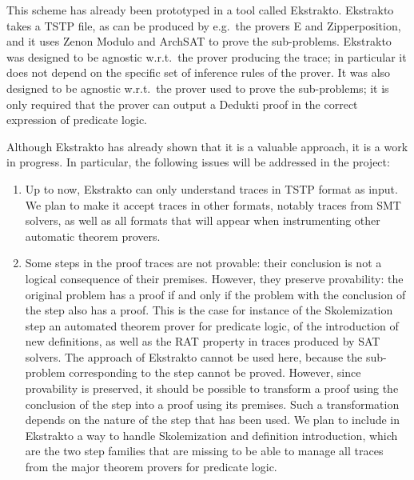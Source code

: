 This scheme has already been prototyped in a tool called
Ekstrakto. Ekstrakto takes a TSTP file, as can be produced by
e.g.\ the provers E and Zipperposition, and it uses Zenon Modulo and
ArchSAT to prove the sub-problems. Ekstrakto was designed to be
agnostic w.r.t.\ the prover producing the trace; in particular it does
not depend on the specific set of inference rules of the prover. It
was also designed to be agnostic w.r.t.\ the prover used to prove the
sub-problems; it is only required that the prover can output a Dedukti
proof in the correct expression of predicate logic.

Although Ekstrakto has already shown that it is a valuable approach,
it is a work in progress. In particular, the following issues will be
addressed in the project:

\begin{enumerate}
\item Up to now, Ekstrakto can only understand traces in TSTP format as
  input. We plan to make it accept traces in other formats, notably traces
  from SMT solvers, as well as all formats that will appear when instrumenting
  other automatic theorem provers.

\item Some steps in the proof traces are not provable: their
  conclusion is not a logical consequence of their premises. However,
  they preserve provability: the original problem has a proof if and
  only if the problem with the conclusion of the step also has a
  proof. This is the case for instance of the Skolemization step an
  automated theorem prover for predicate logic, of the introduction of
  new definitions, as well as the RAT property in traces produced by
  SAT solvers. The approach of Ekstrakto cannot be used here, because
  the sub-problem corresponding to the step cannot be proved. However,
  since provability is preserved, it should be possible to transform a
  proof using the conclusion of the step into a proof using its
  premises. Such a transformation depends on the nature of the step
  that has been used. We plan to include in Ekstrakto a way to handle
  Skolemization and definition introduction, which are the two step
  families that are missing to be able to manage all traces from the
  major theorem provers for predicate logic.



\end{enumerate}
